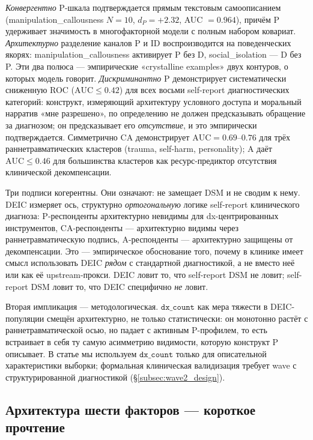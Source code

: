 \emph{Конвергентно} P-шкала подтверждается прямым текстовым самоописанием (manipulation\_callousness $N = 10$, $d_P = +2.32$, AUC $= 0.964$), причём P удерживает значимость в многофакторной модели с полным набором ковариат. \emph{Архитектурно} разделение каналов P и ID воспроизводится на поведенческих якорях: manipulation\_callousness активирует P без D, social\_isolation --- D без P. Эти два полюса --- эмпирические «crystalline examples» двух контуров, о которых модель говорит. \emph{Дискриминантно} P демонстрирует систематически сниженную ROC ($\mathrm{AUC} \leq 0.42$) для всех восьми self-report диагностических категорий: конструкт, измеряющий архитектуру условного доступа и моральный нарратив «мне разрешено», по определению не должен предсказывать обращение за диагнозом; он предсказывает его \emph{отсутствие}, и это эмпирически подтверждается. Симметрично CA демонстрирует $\mathrm{AUC} = 0.69$--$0.76$ для трёх раннетравматических кластеров (trauma, self-harm, personality); A даёт $\mathrm{AUC} \leq 0.46$ для большинства кластеров как ресурс-предиктор отсутствия клинической декомпенсации.

Три подписи когерентны. Они означают: \DEIC{} не замещает DSM и не сводим к нему. DEIC измеряет ось, структурно \emph{ортогональную} логике self-report клинического диагноза: P-респонденты архитектурно невидимы для dx-центрированных инструментов, CA-респонденты --- архитектурно видимы через раннетравматическую подпись, A-респонденты --- архитектурно защищены от декомпенсации. Это --- эмпирическое обоснование того, почему в клинике имеет смысл использовать DEIC \emph{рядом} с стандартной диагностикой, а не вместо неё или как её upstream-прокси. DEIC ловит то, что self-report DSM не ловит; self-report DSM ловит то, что DEIC специфично \emph{не} ловит.

Вторая импликация --- методологическая. $\texttt{dx\_count}$ как мера тяжести в DEIC-популяции смещён архитектурно, не только статистически: он монотонно растёт с раннетравматической осью, но падает с активным P-профилем, то есть встраивает в себя ту самую асимметрию видимости, которую конструкт P описывает. В статье мы используем $\texttt{dx\_count}$ только для описательной характеристики выборки; формальная клиническая валидизация требует wave с структурированной диагностикой (§\ref{subsec:wave2_design}).

\subsection{Архитектура шести факторов --- короткое прочтение}

